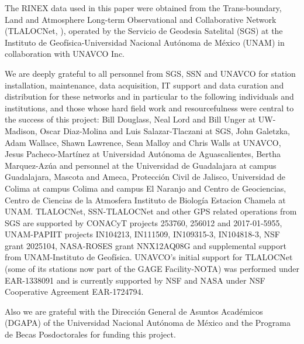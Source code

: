 The RINEX data used in this paper were obtained from the Trans-boundary, Land and Atmosphere Long-term Observational and Collaborative Network (TLALOCNet, \citet{Cabral-Cano:2018}), operated by the Servicio de Geodesia Satelital (SGS) at the Instituto de Geofísica-Universidad Nacional Autónoma de México (UNAM) in collaboration with UNAVCO Inc. 

We are deeply grateful to all personnel from SGS, SSN and UNAVCO for station installation, maintenance, data acquisition, IT support and data curation and distribution for these networks and in particular to the following individuals and institutions, and those whose hard field work and resourcefulness were central to the success of this project: Bill Douglass, Neal Lord and Bill Unger at UW-Madison, Oscar Diaz-Molina and Luis Salazar-Tlaczani at SGS, John Galetzka, Adam Wallace, Shawn Lawrence, Sean Malloy and Chris Walls at UNAVCO, Jesus Pacheco-Martínez at Universidad Autónoma de Aguascalientes, Bertha Marquez-Azúa and personnel at the Universidad de Guadalajara at campus Guadalajara, Mascota and Ameca, Protección Civil de Jalisco, Universidad de Colima at campus Colima and campus El Naranjo and Centro de Geociencias, Centro de Ciencias de la Atmosfera Instituto de Biología Estacion Chamela at UNAM.
TLALOCNet, SSN-TLALOCNet and other GPS related operations from SGS are supported by CONACyT projects 253760, 256012 and 2017-01-5955, UNAM-PAPIIT projects IN104213, IN111509, IN109315-3, IN104818-3, NSF grant 2025104, NASA-ROSES grant NNX12AQ08G and supplemental support from UNAM-Instituto de Geofísica. UNAVCO's initial support for TLALOCNet (some of its stations now part of the GAGE Facility-NOTA) was performed under EAR-1338091 and is currently supported by NSF and NASA under NSF Cooperative Agreement EAR-1724794.

Also we are grateful with the Direcci\'on General de Asuntos Acad\'emicos (DGAPA) of the Universidad Nacional Aut\'onoma de M\'exico and the Programa de Becas Posdoctorales for funding this project.
